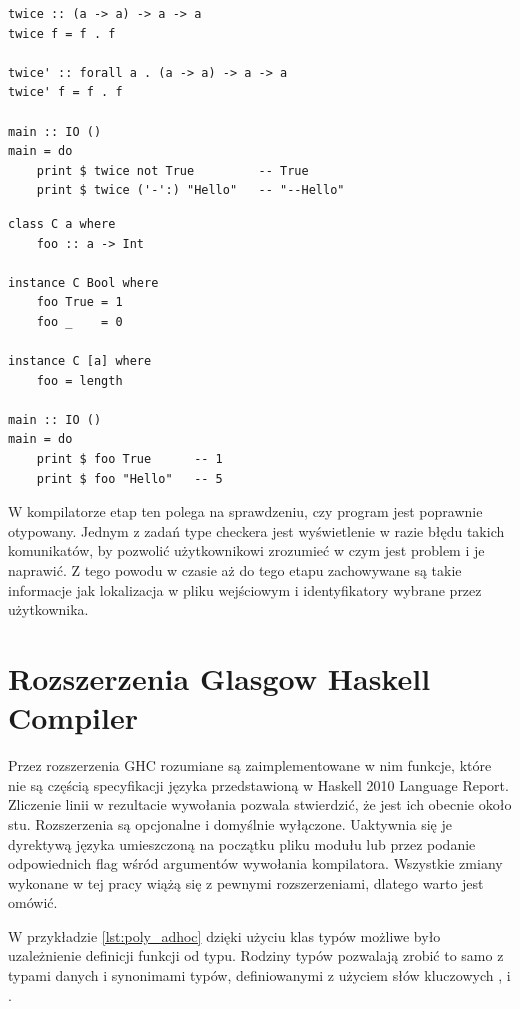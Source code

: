 {\begin{lstlisting}[float,label={lst:poly_parametric},
                   caption={Przykład użycia polimorfizmu parametrycznego w Haskellu.}]
twice :: (a -> a) -> a -> a
twice f = f . f

twice' :: forall a . (a -> a) -> a -> a
twice' f = f . f

main :: IO ()
main = do
    print $ twice not True         -- True
    print $ twice ('-':) "Hello"   -- "--Hello"
\end{lstlisting}

\begin{lstlisting}[float,label={lst:poly_adhoc},
                   caption={Przykład użycia polimorfizmu ad-hoc w Haskellu.}]
class C a where
    foo :: a -> Int

instance C Bool where
    foo True = 1
    foo _    = 0

instance C [a] where
    foo = length

main :: IO ()
main = do
    print $ foo True      -- 1
    print $ foo "Hello"   -- 5
\end{lstlisting}

W kompilatorze etap ten polega na sprawdzeniu, czy program jest poprawnie
otypowany. Jednym z zadań type checkera jest wyświetlenie w razie błędu takich
komunikatów, by pozwolić użytkownikowi zrozumieć w czym jest problem i je
naprawić. Z tego powodu w czasie aż do tego etapu zachowywane są takie
informacje jak lokalizacja w pliku wejściowym i identyfikatory wybrane przez
użytkownika.

\section{Rozszerzenia Glasgow Haskell Compiler}\label{sec:rozszerzenia_ghc}

Przez rozszerzenia GHC rozumiane są zaimplementowane w nim funkcje, które nie są
częścią specyfikacji języka przedstawioną w Haskell 2010 Language
Report. Zliczenie linii w rezultacie wywołania 
pozwala stwierdzić, że jest ich obecnie około stu. Rozszerzenia są opcjonalne i
domyślnie wyłączone. Uaktywnia się je dyrektywą języka umieszczoną na początku
pliku modułu lub przez podanie odpowiednich flag wśród argumentów wywołania
kompilatora. Wszystkie zmiany wykonane w tej pracy wiążą się z pewnymi
rozszerzeniami, dlatego warto jest omówić.

\label{sec:rodziny_typow}

W przykładzie \ref{lst:poly_adhoc} dzięki użyciu klas typów możliwe było
uzależnienie definicji funkcji od typu. Rodziny typów pozwalają zrobić to samo z
typami danych i synonimami typów, definiowanymi z użyciem słów kluczowych
,  i .

}
